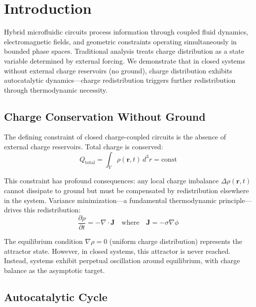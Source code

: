 \documentclass[12pt,a4paper]{article}
\theoremstyle{plain}
\theoremstyle{definition}
\theoremstyle{remark}
\begin{document}
\tableofcontents
\newpage

\section{Introduction}
\label{sec:introduction}

Hybrid microfluidic circuits process information through coupled fluid dynamics, electromagnetic fields, and geometric constraints operating simultaneously in bounded phase spaces. Traditional analysis treats charge distribution as a state variable determined by external forcing. We demonstrate that in closed systems without external charge reservoirs (no ground), charge distribution exhibits autocatalytic dynamics—charge redistribution triggers further redistribution through thermodynamic necessity.

\subsection{Charge Conservation Without Ground}

The defining constraint of closed charge-coupled circuits is the absence of external charge reservoirs. Total charge is conserved:
\begin{equation}
Q_{\text{total}} = \int_V \rho(\mathbf{r},t) \, d^3r = \text{const}
\label{eq:charge_conservation}
\end{equation}

This constraint has profound consequences: any local charge imbalance $\Delta \rho(\mathbf{r},t)$ cannot dissipate to ground but must be compensated by redistribution elsewhere in the system. Variance minimization—a fundamental thermodynamic principle—drives this redistribution:
\begin{equation}
\frac{\partial \rho}{\partial t} = -\nabla \cdot \mathbf{J} \quad \text{where} \quad \mathbf{J} = -\sigma \nabla \phi
\end{equation}

The equilibrium condition $\nabla \rho = 0$ (uniform charge distribution) represents the attractor state. However, in closed systems, this attractor is never reached. Instead, systems exhibit perpetual oscillation around equilibrium, with charge balance as the asymptotic target.

\subsection{Autocatalytic Cycle}
\end{document}
